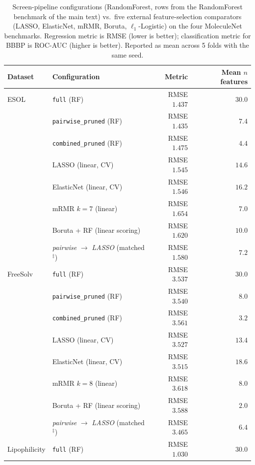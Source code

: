 \documentclass[11pt,a4paper]{article}
\begin{document}
\begin{table}[h]
\centering
\small
\caption{Screen-pipeline configurations (RandomForest, rows from the RandomForest benchmark of the main text) vs.\ five external feature-selection comparators (LASSO, ElasticNet, mRMR, Boruta, $\ell_1$-Logistic) on the four MoleculeNet benchmarks. Regression metric is RMSE (lower is better); classification metric for BBBP is ROC-AUC (higher is better). Reported as mean across 5 folds with the same seed.}
\label{tab:fs_comparison}
\begin{tabular}{llrr}
\toprule
Dataset & Configuration & Metric & Mean $n$ features\\
\midrule
ESOL & \texttt{full} (RF)                 & RMSE $1.437$ & $30.0$\\
     & \texttt{pairwise\_pruned} (RF)     & RMSE $1.435$ & $\phantom{0}7.4$\\
     & \texttt{combined\_pruned} (RF)     & RMSE $1.475$ & $\phantom{0}4.4$\\
     & LASSO (linear, CV)                 & RMSE $1.545$ & $14.6$\\
     & ElasticNet (linear, CV)            & RMSE $1.546$ & $16.2$\\
     & mRMR $k{=}7$ (linear)              & RMSE $1.654$ & $\phantom{0}7.0$\\
     & Boruta + RF (linear scoring)       & RMSE $1.620$ & $10.0$\\
     & \emph{pairwise} $\to$ \emph{LASSO} (matched$^{\ddagger}$) & RMSE $1.580$ & $\phantom{0}7.2$\\
\midrule
FreeSolv & \texttt{full} (RF)             & RMSE $3.537$ & $30.0$\\
         & \texttt{pairwise\_pruned} (RF) & RMSE $3.540$ & $\phantom{0}8.0$\\
         & \texttt{combined\_pruned} (RF) & RMSE $3.561$ & $\phantom{0}3.2$\\
         & LASSO (linear, CV)             & RMSE $3.527$ & $13.4$\\
         & ElasticNet (linear, CV)        & RMSE $3.515$ & $18.6$\\
         & mRMR $k{=}8$ (linear)          & RMSE $3.618$ & $\phantom{0}8.0$\\
         & Boruta + RF (linear scoring)   & RMSE $3.588$ & $\phantom{0}2.0$\\
         & \emph{pairwise} $\to$ \emph{LASSO} (matched$^{\ddagger}$) & RMSE $3.465$ & $\phantom{0}6.4$\\
\midrule
Lipophilicity & \texttt{full} (RF)        & RMSE $1.030$ & $30.0$\\

\end{tabular}
\end{table}
\end{document}
